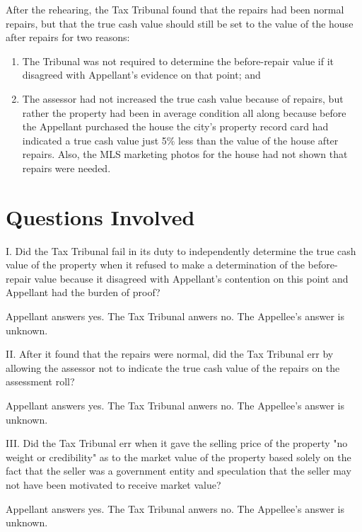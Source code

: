 \documentclass[12pt,\documentclassflag]{michiganCourtOfAppealsBrief}
\begin{document}
After the rehearing, the Tax Tribunal found that the repairs had been normal repairs, but that the true cash value should still be set to the value of the house after repairs for two reasons:

\begin{enumerate}
	\item The Tribunal was not required to determine the before-repair value if it disagreed with Appellant's evidence on that point; and
	\item The assessor had not increased the true cash value because of repairs, but rather the property had been in average condition all along because before the Appellant purchased the house the city's property record card had indicated a true cash value just 5\% less than the value of the house after repairs. Also, the MLS marketing photos for the house had not shown that repairs were needed. 
\end{enumerate}


\newpage 
\section{Questions Involved}

\noindent I. Did the Tax Tribunal fail in its duty to independently determine the true cash value of the property when it refused to make a determination of the before-repair value because it disagreed with Appellant's contention on this point and Appellant had the burden of proof?

Appellant answers yes. The Tax Tribunal anwers no. The Appellee's answer is unknown. 
\vspace{\baselineskip}

\noindent II. After it found that the repairs were normal, did the Tax Tribunal err by allowing the assessor not to indicate the true cash value of the repairs on the assessment roll?

Appellant answers yes. The Tax Tribunal anwers no. The Appellee's answer is unknown. 
\vspace{\baselineskip}

\noindent III. Did the Tax Tribunal err when it gave the selling price of the property "no weight or credibility" as to the market value of the property based solely on the fact that the seller was a government entity and speculation that the seller may not have been motivated to receive market value?

Appellant answers yes. The Tax Tribunal anwers no. The Appellee's answer is unknown. 
\vspace{\baselineskip}
\end{document}
